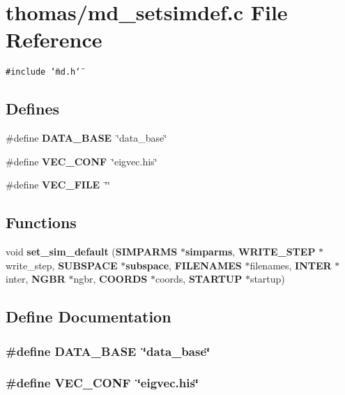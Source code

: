 \section{thomas/md\_\-setsimdef.c File Reference}
\label{thomas_2md__setsimdef_8c}
{\tt \#include \char`\"{}md.h\char`\"{}}\par
\subsection*{Defines}
\begin{CompactItemize}
\item 
\#define {\bf DATA\_\-BASE}~\char`\"{}data\_\-base\char`\"{}
\item 
\#define {\bf VEC\_\-CONF}~\char`\"{}eigvec.his\char`\"{}
\item 
\#define {\bf VEC\_\-FILE}~\char`\"{}\char`\"{}
\end{CompactItemize}
\subsection*{Functions}
\begin{CompactItemize}
\item 
void {\bf set\_\-sim\_\-default} ({\bf SIMPARMS} $\ast${\bf simparms}, {\bf WRITE\_\-STEP} $\ast$write\_\-step, {\bf SUBSPACE} $\ast${\bf subspace}, {\bf FILENAMES} $\ast$filenames, {\bf INTER} $\ast$inter, {\bf NGBR} $\ast$ngbr, {\bf COORDS} $\ast$coords, {\bf STARTUP} $\ast$startup)
\end{CompactItemize}


\subsection{Define Documentation}
\subsubsection{\setlength{\rightskip}{0pt plus 5cm}\#define DATA\_\-BASE~\char`\"{}data\_\-base\char`\"{}}\label{thomas_2md__setsimdef_8c_3c3b59f1ce84cdb39bb6e624512d4e1d}


\subsubsection{\setlength{\rightskip}{0pt plus 5cm}\#define VEC\_\-CONF~\char`\"{}eigvec.his\char`\"{}}\label{thomas_2md__setsimdef_8c_e42089b70137cfaa830942b973402768}



